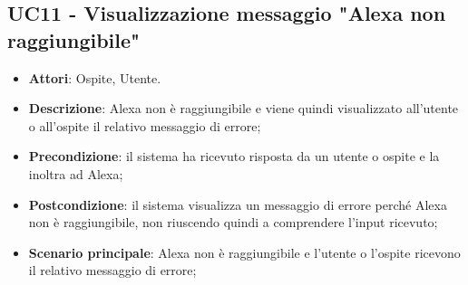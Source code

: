 \documentclass[../AnalisiDeiRequisiti_v4.0.0.tex]{subfiles}
\begin{document}
\subsection{UC11 - Visualizzazione messaggio "Alexa non raggiungibile"} 
\label{sssec:UC11} 
\begin{itemize} 
\item \textbf{Attori}: Ospite, Utente.
\item \textbf{Descrizione}: Alexa non è raggiungibile e viene quindi visualizzato all'utente o all'ospite il relativo messaggio di errore;
\item \textbf{Precondizione}: il sistema ha ricevuto risposta da un utente o ospite e la inoltra ad Alexa;
\item \textbf{Postcondizione}: il sistema visualizza un messaggio di errore perché Alexa non è raggiungibile, non riuscendo quindi a comprendere l'input ricevuto;
\item \textbf{Scenario principale}: Alexa non è raggiungibile e l'utente o l'ospite ricevono il relativo messaggio di errore;
\end{itemize} 
\end{document}
